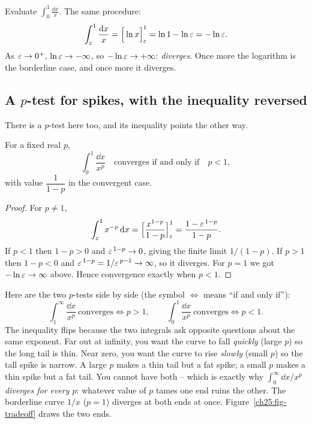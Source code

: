 \begin{example}
\label{ch25:ex-recip}
Evaluate $\displaystyle\int_0^{1}\frac{\dd x}{x}$. The same procedure:
\[
  \int_{\varepsilon}^{1}\frac{\mathrm{d} x}{x} = \Big[\ln x\Big]_{\varepsilon}^{1}
  = \ln 1 - \ln\varepsilon = -\ln\varepsilon.
\]
As $\varepsilon\to 0^+$, $\ln\varepsilon\to -\infty$, so $-\ln\varepsilon\to+\infty$: \emph{diverges}.
Once more the logarithm is the borderline case, and once more it diverges.
\end{example}

\subsection{A $p$-test for spikes, with the inequality reversed}
\label{ch25:p-test-zero}

There is a $p$-test here too, and its inequality points the other way.

\begin{theorem}
\label{ch25:thm-p-zero}
For a fixed real $p$,
\[
  \int_0^{1} \frac{\dd x}{x^{p}}
  \quad\text{converges if and only if}\quad p < 1,
\]
with value $\dfrac{1}{1-p}$ in the convergent case.
\end{theorem}

\begin{proof}
For $p\ne 1$,
\[
  \int_{\varepsilon}^{1} x^{-p}\,\mathrm{d} x
  = \Big[\frac{x^{1-p}}{1-p}\Big]_{\varepsilon}^{1}
  = \frac{1 - \varepsilon^{\,1-p}}{1-p}.
\]
If $p < 1$ then $1-p > 0$ and $\varepsilon^{\,1-p}\to 0$, giving the finite limit
$1/(1-p)$. If $p > 1$ then $1-p < 0$ and $\varepsilon^{\,1-p} = 1/\varepsilon^{\,p-1}\to\infty$,
so it diverges. For $p=1$ we got $-\ln\varepsilon\to\infty$ above. Hence convergence
exactly when $p<1$.
\end{proof}

\begin{aestheticbox}
Here are the two $p$-tests side by side (the symbol $\iff$ means ``if and only
if''):
\[
  \int_1^{\infty}\frac{\dd x}{x^p}\ \text{converges} \iff p > 1,
  \qquad
  \int_0^{1}\frac{\dd x}{x^p}\ \text{converges} \iff p < 1.
\]
The inequality flips because the two integrals ask opposite questions about the
same exponent. Far out at infinity, you want the
curve to fall \emph{quickly} (large $p$) so the long tail is thin. Near zero, you
want the curve to rise \emph{slowly} (small $p$) so the tall spike is narrow.
A large $p$ makes a thin tail but a fat spike; a small $p$ makes a thin spike but a
fat tail. You cannot have both -- which is exactly why $\int_0^\infty \dd x/x^p$
\emph{diverges for every $p$}: whatever value of $p$ tames one end ruins the
other. The borderline curve $1/x$ ($p=1$) diverges at both ends at once.
Figure~\ref{ch25:fig-tradeoff} draws the two ends.
\end{aestheticbox}

